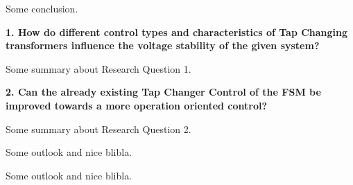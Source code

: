 Some conclusion.

\textbf{1. How do different control types and characteristics of Tap Changing transformers influence the voltage stability of the given system?}

Some summary about Research Question 1. \lipsum[1]

\textbf{2. Can the already existing Tap Changer Control of the \acf{FSM} be improved towards a more operation oriented control?}

Some summary about Research Question 2. \lipsum[2]

Some outlook and nice blibla. \lipsum[3]

Some outlook and nice blibla. \lipsum[3]